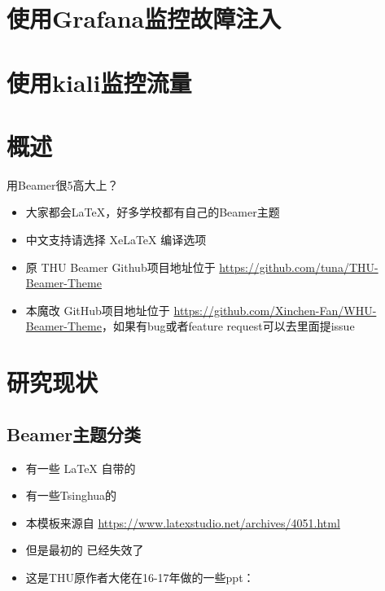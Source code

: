 \documentclass{beamer}
\begin{document}
\section{使用Grafana监控故障注入}

\section{使用kiali监控流量}

\section{概述}
\begin{frame}{用Beamer很5高大上？}
    \begin{itemize}[<+-| alert@+>] %
        \item 大家都会\LaTeX{}，好多学校都有自己的Beamer主题
        \item 中文支持请选择 Xe\LaTeX{} 编译选项
        \item 原 THU Beamer Github项目地址位于 \url{https://github.com/tuna/THU-Beamer-Theme}
        \item 本魔改 GitHub项目地址位于 \url{https://github.com/Xinchen-Fan/WHU-Beamer-Theme}，如果有bug或者feature request可以去里面提issue
    \end{itemize}
\end{frame}


\section{研究现状}

\subsection{Beamer主题分类}

\begin{frame}
    \begin{itemize}
        \item 有一些 \LaTeX{} 自带的
        \item 有一些Tsinghua的
        \item 本模板来源自 \newline \url{https://www.latexstudio.net/archives/4051.html}
        \item 但是最初的 \href{http://far.tooold.cn/post/latex/beamertsinghua}{\color{purple}{link}} \cite{origin}已经失效了
        \item 这是THU原作者大佬在16-17年做的一些ppt：\href{https://github.com/Trinkle23897/oi_slides}{\color{purple}{戳我}}
    \end{itemize}
\end{frame}
\end{document}
